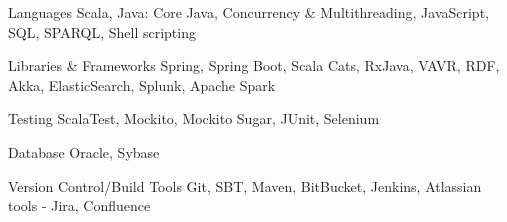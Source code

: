 
\begin{cvskills}
  \cvskill
    {Languages} %
    {Scala, Java: Core Java, Concurrency \& Multithreading, JavaScript, SQL, SPARQL, Shell scripting } %

  \cvskill
    {Libraries \& Frameworks} %
    {Spring, Spring Boot, Scala Cats, RxJava, VAVR, RDF, Akka, ElasticSearch, Splunk, Apache Spark} %

  \cvskill
    {Testing} %
    {ScalaTest, Mockito, Mockito Sugar, JUnit, Selenium} %

  \cvskill
    {Database} %
    {Oracle, Sybase} %

  \cvskill
    {Version Control/Build Tools} %
    {Git, SBT, Maven, BitBucket, Jenkins, Atlassian tools - Jira, Confluence} %
\end{cvskills}
